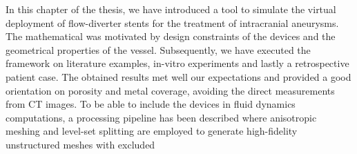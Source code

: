 \begin{tcolorbox}[conclusions]

	In this chapter of the thesis, we have introduced a tool to simulate the virtual deployment of flow-diverter stents for the treatment of intracranial aneurysms. The mathematical was motivated by design constraints of the devices and the geometrical properties of the vessel. Subsequently, we have executed the framework on literature examples, in-vitro experiments and lastly a retrospective patient case. The obtained results met well our expectations and provided a good orientation on porosity and metal coverage, avoiding the direct measurements from CT images. To be able to include the devices in fluid dynamics computations, a processing pipeline has been described where anisotropic meshing and level-set splitting are employed to generate high-fidelity unstructured meshes with excluded

\end{tcolorbox}

\newpage

{\footnotesize
	}